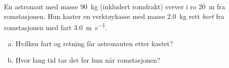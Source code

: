 %
En astronaut med masse \SI{90}{\kilo\gram} (inkludert romdrakt) svever i ro \SI{20}{\metre} fra romstasjonen. Hun kaster en verktøykasse med masse \SI{2.0}{\kilo\gram} rett \emph{bort} fra romstasjonen med fart \SI{3.0}{\metre\per\second}.
\begin{enumerate}[a)]
    \item Hvilken fart og retning får astronauten etter kastet?
    \item Hvor lang tid tar det før hun når romstasjonen?
\end{enumerate}
